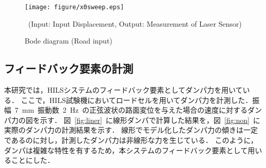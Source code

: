 \documentclass[a4paper,12pt]{article_vdlab_sotsuron}
\begin{document}
\vspace{10mm}
\begin{figure}[h]
  \begin{center}
   \texttt{[image: figure/x0sweep.eps]}
  \vspace{2mm}
\caption{Bode diagram (Road input)}
\  (Input: Input Displacement, Output: Measurement of Laser Sensor)
  \label{fig:x0sweep}
  \end{center}
\end{figure}


\newpage
\subsection{フィードバック要素の計測}
本研究では，HILSシステムのフィードバック要素としてダンパ力を用いている．
ここで，HILS試験機においてロードセルを用いてダンパ力を計測した．振幅~7~mm~振動数~2~Hz~の正弦波状の路面変位を与えた場合の速度に対するダンパ力の図を示す．
図~\ref{fig:liner}~に線形ダンパで計算した結果を，図~\ref{fig:non}~に実際のダンパ力の計測結果を示す．
線形でモデル化したダンパ力の傾きは一定であるのに対し，計測したダンパ力は非線形な力を生じている．
このように，ダンパは複雑な特性を有するため，本システムのフィードバック要素として用いることにした．
\end{document}
